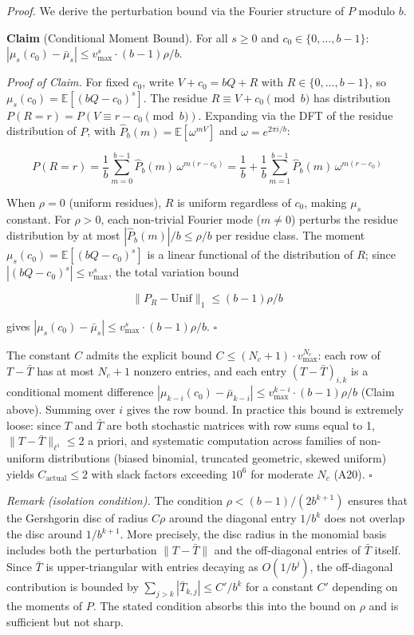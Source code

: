 \documentclass[
  11pt,
]{article}
\begin{document}
\emph{Proof.} We derive the perturbation bound via the Fourier structure of
\(P\) modulo \(b\).

\textbf{Claim} (Conditional Moment Bound). For all \(s \geq 0\) and
\(c_0 \in \lbrace{}0, \ldots, b-1\rbrace{}\):
\(|\mu_s(c_0) - \bar{\mu}_s| \leq v_{\max}^s \cdot (b-1)\rho/b\).

\emph{Proof of Claim.} For fixed \(c_0\), write \(V + c_0 = bQ + R\) with
\(R \in \lbrace{}0, \ldots, b-1\rbrace{}\), so
\(\mu_s(c_0) = \mathbb{E}[(bQ - c_0)^s]\). The residue
\(R \equiv V + c_0 \pmod{b}\) has distribution
\(P(R = r) = P(V \equiv r - c_0 \pmod{b})\). Expanding via the DFT of the
residue distribution of \(P\), with \(\hat{P}_b(m) = \mathbb{E}[\omega^{mV}]\)
and \(\omega = e^{2\pi i/b}\):

\[P(R = r) = \frac{1}{b}\sum_{m=0}^{b-1}\hat{P}_b(m)\,\omega^{m(r - c_0)} = \frac{1}{b} + \frac{1}{b}\sum_{m=1}^{b-1}\hat{P}_b(m)\,\omega^{m(r - c_0)}\]

When \(\rho = 0\) (uniform residues), \(R\) is uniform regardless of \(c_0\),
making \(\mu_s\) constant. For \(\rho > 0\), each non-trivial Fourier mode
(\(m \neq 0\)) perturbs the residue distribution by at most
\(|\hat{P}_b(m)|/b \leq \rho/b\) per residue class. The moment
\(\mu_s(c_0) = \mathbb{E}[(bQ - c_0)^s]\) is a linear functional of the
distribution of \(R\); since \(|(bQ - c_0)^s| \leq v_{\max}^s\), the total
variation bound

\[\|P_R - \mathrm{Unif}\|_1 \leq (b-1)\rho/b\]

gives \(|\mu_s(c_0) - \bar{\mu}_s| \leq v_{\max}^s \cdot (b-1)\rho/b\).
\(\square\)

The constant \(C\) admits the explicit bound
\(C \leq (N_c+1) \cdot v_{\max}^{N_c}\): each row of \(T - \bar{T}\) has at most
\(N_c+1\) nonzero entries, and each entry \((T - \bar{T})_{i,k}\) is a
conditional moment difference
\(|\mu_{k-i}(c_0) - \bar{\mu}_{k-i}| \leq v_{\max}^{k-i} \cdot (b-1)\rho/b\)
(Claim above). Summing over \(i\) gives the row bound. In practice this bound is
extremely loose: since \(T\) and \(\bar{T}\) are both stochastic matrices with
row sums equal to 1, \(\|T - \bar{T}\|_{\ell^1} \leq 2\) a priori, and
systematic computation across families of non-uniform distributions (biased
binomial, truncated geometric, skewed uniform) yields
\(C_{\text{actual}} \leq 2\) with slack factors exceeding \(10^6\) for moderate
\(N_c\) (A20). \(\square\)

\emph{Remark (isolation condition).} The condition \(\rho < (b-1)/(2b^{k+1})\)
ensures that the Gershgorin disc of radius \(C\rho\) around the diagonal entry
\(1/b^k\) does not overlap the disc around \(1/b^{k+1}\). More precisely, the
disc radius in the monomial basis includes both the perturbation
\(\|T - \bar{T}\|\) and the off-diagonal entries of \(\bar{T}\) itself. Since
\(\bar{T}\) is upper-triangular with entries decaying as \(O(1/b^j)\), the
off-diagonal contribution is bounded by
\(\sum_{j > k} |\bar{T}_{k,j}| \leq C'/b^k\) for a constant \(C'\) depending on
the moments of \(P\). The stated condition absorbs this into the bound on
\(\rho\) and is sufficient but not sharp.
\end{document}
